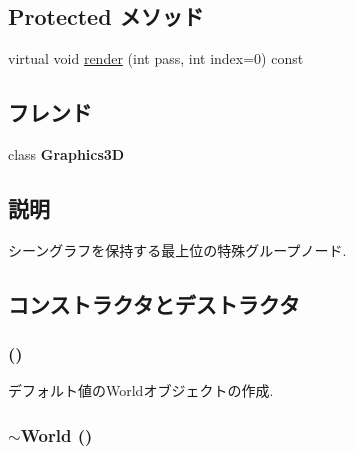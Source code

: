 \subsection*{Protected メソッド}
\begin{CompactItemize}
\item 
virtual void \hyperlink{classm3g_1_1World_1efcb1973989d9963d5bd6d03065d389}{render} (int pass, int index=0) const 
\end{CompactItemize}
\subsection*{フレンド}
\begin{CompactItemize}
\item 
\hypertarget{classm3g_1_1World_8174d4c629550c1ee279571250236ef4}{
class \textbf{Graphics3D}}
\label{classm3g_1_1World_8174d4c629550c1ee279571250236ef4}

\end{CompactItemize}


\subsection{説明}
シーングラフを保持する最上位の特殊グループノード. 

\subsection{コンストラクタとデストラクタ}
\hypertarget{classm3g_1_1World_75e827b8787e735882f60c266d58e02e}{
\subsubsection[{World}]{ ()}}
\label{classm3g_1_1World_75e827b8787e735882f60c266d58e02e}


デフォルト値のWorldオブジェクトの作成. \hypertarget{classm3g_1_1World_bd170ded455f0b2273c1fe06da6ea0cb}{
\subsubsection[{$\sim$World}]{\setlength{\rightskip}{0pt plus 5cm}$\sim${\bf World} ()}}
\label{classm3g_1_1World_bd170ded455f0b2273c1fe06da6ea0cb}



